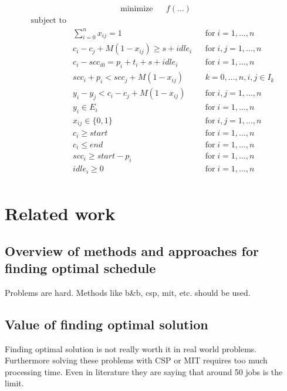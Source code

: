 \documentclass{ctuthesis}
\begin{document}
\begin{equation}
\begin{aligned}
&\text{minimize}
&&f(\ldots)
\end{aligned}
\end{equation}
\begin{equation}
\begin{aligned}
\text{subject to}\\
& \sum_{i=0}^{n} x_{ij} = 1 && \text{for}\; i = 1, \ldots, n\\
& c_{i} - c_{j} + M(1 - x_{ij}) \geq s + idle_{i} && \text{for}\; i,j = 1, \ldots, n\\
& c_{i} - scc_{i0} = p_{i} + t_i + s + idle_i && \text{for}\; i = 1, \ldots, n\\
& scc_{i} + p_i < scc_j + M(1 - x_{ij}) && k = 0,\ldots,n, i,j \in I_k\\
& y_{i} - y_{j} < c_i - c_j + M(1 - x_{ij}) && \text{for}\; i,j = 1, \ldots, n\\
& y_i \in E_i && \text{for}\; i = 1, \ldots, n\\
& x_{ij} \in \{0, 1\}  && \text{for}\; i,j = 1, \ldots, n\\ 
& c_i \geq start && \text{for}\; i = 1, \ldots, n\\
& c_i \leq end && \text{for}\; i = 1, \ldots, n\\
& scc_{i} \geq start - p_i && \text{for}\; i = 1, \ldots, n\\
& idle_i \geq 0 && \text{for}\; i = 1, \ldots, n\\
\end{aligned}
\end{equation}

\chapter{Related work}

\section{Overview of methods and approaches for finding optimal schedule}
Problems are hard. Methods like b\&b, csp, mit, etc. should be used.
\section{Value of finding optimal solution}
Finding optimal solution is not really worth it in real world problems. Furthermore solving these problems with CSP or MIT requires too much processing time. Even in literature they are saying that around 50 jobs is the limit. 
\end{document}
